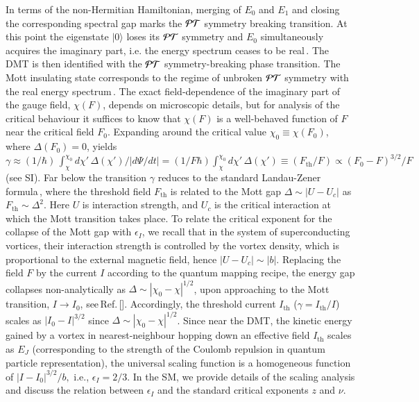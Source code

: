 \documentclass[aps,twocolumn,prl,10pt,amsmath,amssymb,nofootinbib,showpacs,superscriptaddress,floatfix]{revtex4-1}
\begin{document}
 In terms of the non-Hermitian Hamiltonian, merging of $E_0$ and $E_1$ and closing the corresponding spectral gap marks the 
  ${\cal PT}$ symmetry breaking transition. 
  At this point the eigenstate $|0\rangle$ loses its ${\cal PT}$ symmetry and $E_0$ simultaneously acquires the imaginary part, i.e. the energy spectrum ceases to be real\,\cite{Bender}.  The DMT is then identified
 with the ${\cal PT}$ symmetry-breaking phase transition. 
 The Mott insulating state 
 corresponds to the regime of unbroken ${\cal PT}$ symmetry with the real energy spectrum\,\cite{tripathi:2016}.
 The exact field-dependence of the imaginary part of the gauge field, $\chi(F)$, depends on microscopic details, but for analysis of the critical behaviour it suffices to know that $\chi(F)$ is a well-behaved function of $F$ near the critical field $F_0$.
 Expanding around the critical value $\chi_{0}\equiv\chi(F_0)$, where
 $\Delta(F_0)=0$, yields %
 $\gamma\approx(1/\hbar)\,\int_{\chi}^{\chi_0} d\chi'\, \Delta(\chi')/|d\Psi/dt|=(1/F\hbar)\int_{\chi}^{\chi_0} d\chi'\, \Delta(\chi')\equiv (F_{\text{th}}/F) \propto(F_0-F)^{3/2}/F$ (see SI).
 Far below the transition $\gamma$ reduces to the standard Landau-Zener formula\,\cite{Oka:2003,Oka:2010}, where the threshold field $F_{\text{th}}$ is related to the Mott gap $\Delta\sim |U - U_c|$ 
 as $F_{\text{th}} \sim \Delta^2$. 
 Here $U$ is interaction strength, and $U_c$ is the critical interaction at which the Mott transition takes place. To relate the critical exponent for the collapse of the Mott gap with $\epsilon_I$, we recall that in
  the system of superconducting vortices, their
 interaction strength is controlled by the
 vortex density, which is proportional to
 the external magnetic field, hence $|U - U_c|\sim|b|$.
 Replacing the field $F$ by the current $I$ according to the quantum mapping recipe,
 the energy gap collapses non-analytically as $\Delta\sim|\chi_0 - \chi|^{1/2}$, upon approaching to the Mott transition, $I\to I_0$, see\,Ref.\,[]. 
 Accordingly, the threshold current $I_{\text{th}}$ ($\gamma=I_{\text{th}}/I$) scales as $|I_0 - I|^{3/2}$ since $\Delta\sim|\chi_0 - \chi|^{1/2}$.  Since near the DMT, the kinetic energy gained by a vortex in nearest-neighbour hopping down an effective field $I_{\text{th}}$ 
scales as  $E_J$ (corresponding to the strength of the Coulomb repulsion in quantum particle representation), the universal scaling function is a homogeneous function of $|I-I_0|^{3/2}/b,$ i.e., $\epsilon_I = 2/3$. 
In the SM, we provide details of the scaling analysis and discuss the relation between $\epsilon_I$ and the standard critical exponents $z$ and $\nu.$
\end{document}
